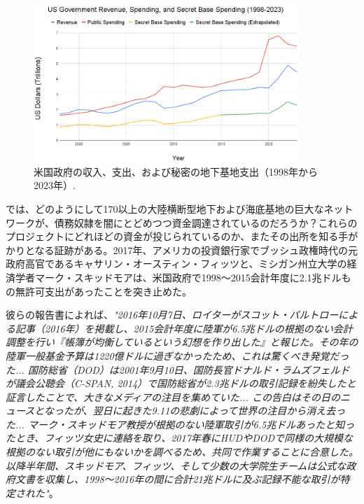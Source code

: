 \documentclass[10pt,twocolumn,letterpaper]{article}
\begin{document}
\begin{figure}[t]
\begin{center}
\includegraphics[width=0.9\textwidth]{govcrop2.png}
\end{center}
   \caption{米国政府の収入、支出、および秘密の地下基地支出（1998年から2023年）\cite{19}.}
   \label{fig:9}
\end{figure}

では、どのようにして170以上の大陸横断型地下および海底基地の巨大なネットワークが、債務奴隷を闇にとどめつつ資金調達されているのだろうか？これらのプロジェクトにどれほどの資金が投じられているのか、またその出所を知る手がかりとなる証跡がある。2017年、アメリカの投資銀行家でブッシュ政権時代の元政府高官であるキャサリン・オースティン・フィッツと、ミシガン州立大学の経済学者マーク・スキッドモアは、米国政府で1998～2015会計年度に2.1兆ドルもの無許可支出があったことを突き止めた\cite{11,12,13}。

彼らの報告書によれば、\textit{"2016年10月7日、ロイターがスコット・パルトローによる記事（2016年）を掲載し、2015会計年度に陸軍が6.5兆ドルの根拠のない会計調整を行い『帳簿が均衡しているという幻想を作り出した』と報じた。その年の陸軍一般基金予算は1220億ドルに過ぎなかったため、これは驚くべき発覚だった... 国防総省（DOD）は2001年9月10日、国防長官ドナルド・ラムズフェルドが議会公聴会（C-SPAN, 2014）で国防総省が2.3兆ドルの取引記録を紛失したと証言したことで、大きなメディアの注目を集めていた... この告白はその日のニュースとなったが、翌日に起きた9.11の悲劇によって世界の注目から消え去った... マーク・スキッドモア教授が根拠のない陸軍取引が6.5兆ドルあったと知ったとき、フィッツ女史に連絡を取り、2017年春にHUDやDODで同様の大規模な根拠のない取引が他にもないかを調べるため、共同で作業することに合意した。以降半年間、スキッドモア、フィッツ、そして少数の大学院生チームは公式な政府文書を収集し、1998～2016年の間に合計21兆ドルに及ぶ記録不能な取引が特定された"}\cite{12}。
\end{document}
